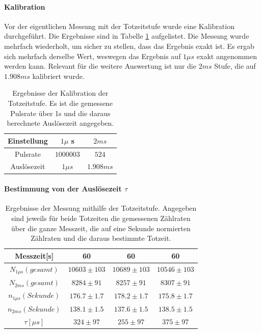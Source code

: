 \documentclass[12pt,a4paper]{article}
\begin{document}
\paragraph{Kalibration}
Vor der eigentlichen Messung mit der Totzeitstufe wurde eine Kalibration durchgeführt. Die Ergebnisse sind in Tabelle \ref{tab:Totzeitkalibration} aufgelistet. Die Messung wurde mehrfach wiederholt, um sicher zu stellen, dass das Ergebnis exakt ist. Es ergab sich mehrfach derselbe Wert, weswegen das Ergebnis auf $1\mu s$ exakt angenommen werden kann. Relevant für die weitere Auswertung ist nur die $2ms$ Stufe, die auf $1.908ms$ kalibriert wurde.

\begin{table}
\centering
\begin{tabular}{|c|c||c|}
\hline
Einstellung & $1\mu$ s & $2ms$\\
\hline 
Pulsrate & $1000003$ & $524$ \\
\hline 
Auslösezeit & $1\mu s$ & $1.908ms$ \\
\hline
\end{tabular}
\caption{Ergebnisse der Kalibration der Totzeitstufe. Es ist die gemessene Pulsrate über 1s und die daraus berechnete Auslösezeit angegeben.}
\label{tab:Totzeitkalibration}
\end{table}

\paragraph{Bestimmung von der Auslösezeit $\tau$}

\begin{table}
\centering
\begin{tabular}{|c|c|c|c|}
\hline
Messzeit[s] & 60 &60&60\\
\hline 
$N_{1\mu s}(gesamt)$ & $10603 \pm 103$ & $10689\pm 103$ & $10546\pm 103$ \\
\hline 
$N_{2ms}(gesamt)$ & $8284\pm 91$ & $8257 \pm 91$ & $8307\pm 91$ \\
\hline 
$n_{1\mu s}(Sekunde)$ & $176.7 \pm 1.7$ & $178.2 \pm 1.7$ & $175.8\pm 1.7$ \\
\hline 
$n_{2ms}(Sekunde)$ & $138.1\pm 1.5$ & $137.6 \pm 1.5$ & $138.5\pm 1.5$ \\
\hline 
$\tau [\mu s]$ & $324\pm 97 $ & $255 \pm 97$ & $375\pm 97$ \\
\hline
\end{tabular}
\caption{Ergebnisse der Messung mithilfe der Totzeitstufe. Angegeben sind jeweils für beide Totzeiten die gemessenen Zählraten über die ganze Messzeit, die auf eine Sekunde normierten Zählraten und die daraus bestimmte Totzeit.}
\label{tab:Totzeitstufe}
\end{table}
\end{document}
